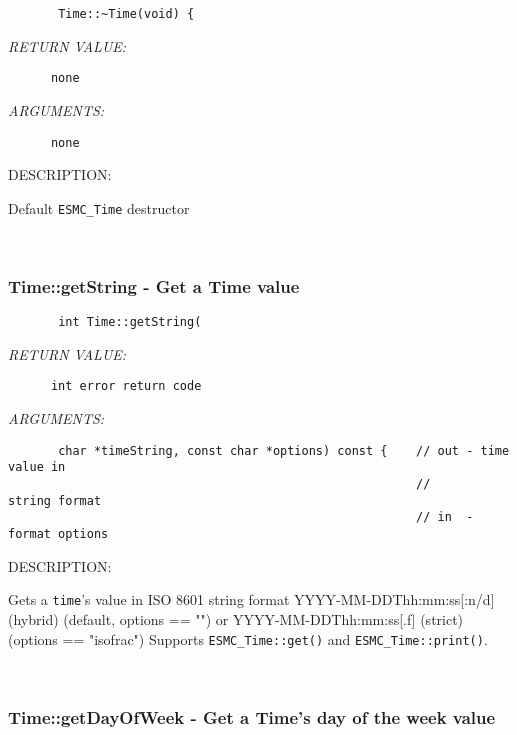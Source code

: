   
\begin{verbatim}       Time::~Time(void) {\end{verbatim}{\em RETURN VALUE:}
\begin{verbatim}      none\end{verbatim}{\em ARGUMENTS:}
\begin{verbatim}      none\end{verbatim}
{\sf DESCRIPTION:\\ }


        Default {\tt ESMC\_Time} destructor
   
 
\mbox{}\hrulefill\ 
 
\subsubsection [Time::getString] {Time::getString - Get a Time value}


  
\begin{verbatim}       int Time::getString(\end{verbatim}{\em RETURN VALUE:}
\begin{verbatim}      int error return code\end{verbatim}{\em ARGUMENTS:}
\begin{verbatim}       char *timeString, const char *options) const {    // out - time value in
                                                         //       string format
                                                         // in  - format options\end{verbatim}
{\sf DESCRIPTION:\\ }


        Gets a {\tt time}'s value in ISO 8601 string format
        YYYY-MM-DDThh:mm:ss[:n/d]  (hybrid) (default, options == "")
        or YYYY-MM-DDThh:mm:ss[.f] (strict) (options == "isofrac")
        Supports {\tt ESMC\_Time::get()} and {\tt ESMC\_Time::print()}.
   
 
\mbox{}\hrulefill\ 
 
\subsubsection [Time::getDayOfWeek] {Time::getDayOfWeek - Get a Time's day of the week value}



